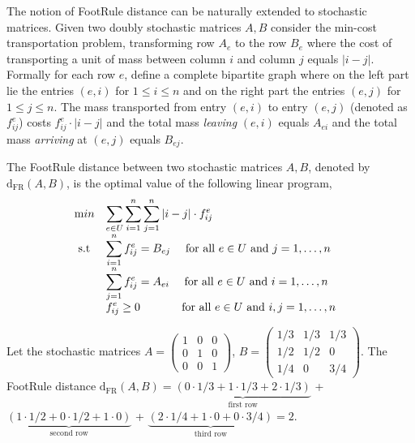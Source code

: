 The notion of FootRule distance can be naturally extended to stochastic matrices. Given two doubly stochastic matrices $A,B$ consider the min-cost transportation problem, transforming row $A_e$ to the row $B_e$ where the cost of transporting a unit of mass between column $i$ and column $j$ equals $|i-j|$. Formally for each row $e$, define a complete bipartite graph where on the left part lie the entries $(e,i)$ for $1\leq i \leq n$ and on the right part the entries $(e,j)$ for $1\leq j \leq n$. The mass transported from entry $(e,i)$ to entry $(e,j)$ (denoted as $f_{ij}^e$)
costs $f_{ij}^e\cdot |i-j|$ and the total mass \textit{leaving} $(e,i)$ equals $A_{ei}$ and the total  mass \textit{arriving} at $(e,j)$ equals $B_{ej}$.
\begin{definition}\label{d:distance_lp}
The FootRule distance between two stochastic matrices 
$A,B$, denoted by $\mathrm{d}_{\mathrm{FR}}(A,B)$, is the optimal value of the following linear program,
\begin{equation*}
    \begin{array}{ll@{}ll}
        \text min & \displaystyle \sum_{e \in U} \sum_{i = 1}^{n} \sum_{j=1}^n |i - j| \cdot f_{ij}^e &\\
        \text{ s.t } & \displaystyle \sum_{i=1}^{n} f_{ij}^e = B_{ej}~~~~\text{for all }e \in U \text{ and }j=1,\ldots ,n&&\\
        & \displaystyle \sum_{j=1}^{n} f_{ij}^e = A_{ei}~~~~\text{for all }e \in U \text{ and }i=1,\ldots, n&&\\
        & \displaystyle f_{ij}^e \geq 0~~~~~~~~~~~\text{for all } e \in U \text{ and }i,j = 1,\ldots, n
    \end{array}
\end{equation*}
\end{definition}
\begin{example}
Let the stochastic matrices $A = 
\begin{pmatrix}
1 & 0 & 0 \\
0 & 1 & 0 \\
0 & 0 & 1
\end{pmatrix}$, $B = 
\begin{pmatrix}
1/3 & 1/3 & 1/3 \\
1/2 & 1/2 & 0 \\
1/4 & 0 & 3/4
\end{pmatrix}$. The FootRule distance $\mathrm{d}_{\mathrm{FR}}(A,B) = \underbrace{(0\cdot 1/3 + 1\cdot 1/3 + 2\cdot 1/3)}_{\text{first row}}$ + $\underbrace{(1\cdot 1/2 + 0\cdot 1/2 + 1\cdot 0)}_{\text{second row}}$
+ $\underbrace{(2\cdot 1/4 + 1\cdot 0 + 0\cdot 3/4)}_{\text{third row}} = 2$.
\end{example}
